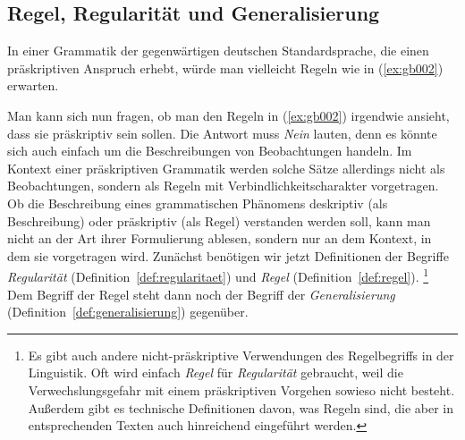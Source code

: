 \subsection{Regel, Regularität und Generalisierung}

\label{sec:regulgen}

In einer Grammatik der gegenwärtigen deutschen Standardsprache, die einen präskriptiven Anspruch erhebt, würde man vielleicht Regeln wie in (\ref{ex:gb002}) erwarten.

\begin{exe}
  \ex\label{ex:gb002}
  \begin{xlist}
  \end{xlist}
\end{exe}

Man kann sich nun fragen, ob man den Regeln in (\ref{ex:gb002}) irgendwie ansieht, dass sie präskriptiv sein sollen.
Die Antwort muss \textit{Nein} lauten, denn es könnte sich auch einfach um die Beschreibungen von Beobachtungen handeln.
Im Kontext einer präskriptiven Grammatik werden solche Sätze allerdings nicht als Beobachtungen, sondern als Regeln mit Verbindlichkeitscharakter vorgetragen.
Ob die Beschreibung eines grammatischen Phänomens deskriptiv (als Beschreibung) oder präskriptiv (als Regel) verstanden werden soll, kann man nicht an der Art ihrer Formulierung ablesen, sondern nur an dem Kontext, in dem sie vorgetragen wird.
Zunächst benötigen wir jetzt Definitionen der Begriffe \textit{Regularität} (Definition~\ref{def:regularitaet}) und \textit{Regel} (Definition~\ref{def:regel}).%
\footnote{Es gibt auch andere nicht-präskriptive Verwendungen des Regelbegriffs in der Linguistik.
Oft wird einfach \textit{Regel} für \textit{Regularität} gebraucht, weil die Verwechslungsgefahr mit einem präskriptiven Vorgehen sowieso nicht besteht.
Außerdem gibt es technische Definitionen davon, was Regeln sind, die aber in entsprechenden Texten auch hinreichend eingeführt werden.}
Dem Begriff der Regel steht dann noch der Begriff der \textit{Generalisierung} (Definition~\ref{def:generalisierung}) gegenüber.


